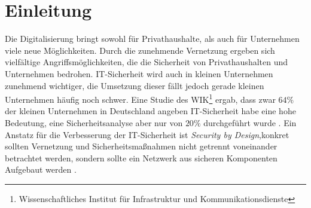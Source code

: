 \chapter{Einleitung}

Die Digitalisierung bringt sowohl für Privathaushalte, als auch für Unternehmen viele neue Möglichkeiten. Durch die zunehmende Vernetzung ergeben sich vielfältige Angriffsmöglichkeiten, die die Sicherheit von Privathaushalten und Unternehmen bedrohen. IT-Sicherheit wird auch in kleinen Unternehmen zunehmend wichtiger, die Umsetzung dieser fällt jedoch gerade kleinen Unternehmen häufig noch schwer. Eine Studie des WIK\footnote{Wissenschaftliches Institut für Infrastruktur und Kommunikationsdienste} ergab, dass zwar $64\%$ der kleinen Unternehmen in Deutschland angeben IT-Sicherheit habe eine hohe Bedeutung, eine Sicherheitsanalyse aber nur von $20\%$ durchgeführt wurde \cite{wik2017KMU}.   
Ein Anstatz für die Verbesserung der IT-Sicherheit ist \emph{Security by Design},konkret sollten Vernetzung und Sicherheitsmaßnahmen nicht getrennt voneinander betrachtet werden, sondern sollte ein Netzwerk aus sicheren Komponenten Aufgebaut werden \cite{nicholson2018blurring}.